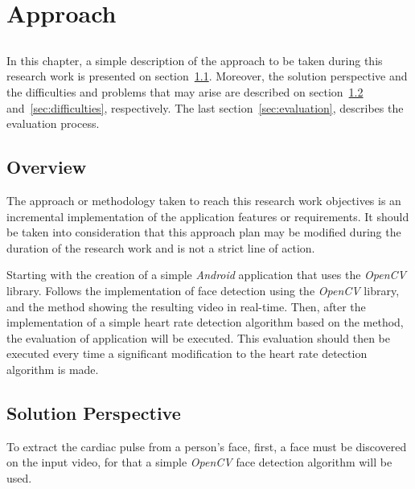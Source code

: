 \chapter{Approach} \label{chap:approach}

\section*{}

In this chapter, a simple description of the approach to be taken during 
this research work is presented on section~\ref{sec:approach}. Moreover, 
the solution perspective and the difficulties and problems that may arise 
are described on section~\ref{sec:solution} and~\ref{sec:difficulties},
respectively. The last section~\ref{sec:evaluation}, describes the 
evaluation process.

\section{Overview} \label{sec:approach}


The approach or methodology taken to reach this research work objectives
is an incremental implementation of the application features or requirements.
It should be taken into consideration that this approach plan may be modified 
during the duration of the research work and is not a strict line of action.

Starting with the creation of a simple \emph{Android} application that uses
the \emph{OpenCV} library. Follows the implementation of face detection using 
the \emph{OpenCV} library, and the \evm{} method showing the resulting video 
in real-time. Then, after the implementation of a simple heart rate detection 
algorithm based on the \evm{} method, the evaluation of application will
be executed. This evaluation should then be executed every time a significant 
modification to the heart rate detection algorithm is made.

\section{Solution Perspective} \label{sec:solution}


To extract the cardiac pulse from a person's face, first, a face must be  
discovered on the input video, for that a simple \emph{OpenCV} face detection
algorithm will be used.

